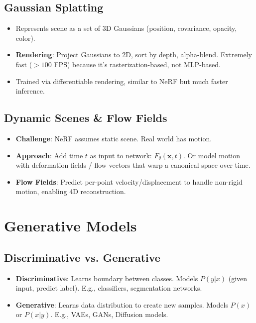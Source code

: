\documentclass[11pt]{article}
\begin{document}
\subsection{Gaussian Splatting}
\begin{itemize}
    \item Represents scene as a set of 3D Gaussians (position, covariance, opacity, color).
    \item \textbf{Rendering}: Project Gaussians to 2D, sort by depth, alpha-blend. Extremely fast ($>100$ FPS) because it's rasterization-based, not MLP-based.
    \item Trained via differentiable rendering, similar to NeRF but much faster inference.
\end{itemize}

\subsection{Dynamic Scenes \& Flow Fields}
\begin{itemize}
    \item \textbf{Challenge}: NeRF assumes static scene. Real world has motion.
    \item \textbf{Approach}: Add time $t$ as input to network: $F_\theta(\mathbf{x}, t)$. Or model motion with deformation fields / flow vectors that warp a canonical space over time.
    \item \textbf{Flow Fields}: Predict per-point velocity/displacement to handle non-rigid motion, enabling 4D reconstruction.
\end{itemize}

\section{Generative Models}
\subsection{Discriminative vs. Generative}
\begin{itemize}
    \item \textbf{Discriminative}: Learns boundary between classes. Models $P(y|x)$ (given input, predict label). E.g., classifiers, segmentation networks.
    \item \textbf{Generative}: Learns data distribution to create new samples. Models $P(x)$ or $P(x|y)$. E.g., VAEs, GANs, Diffusion models.
\end{itemize}
\end{document}
